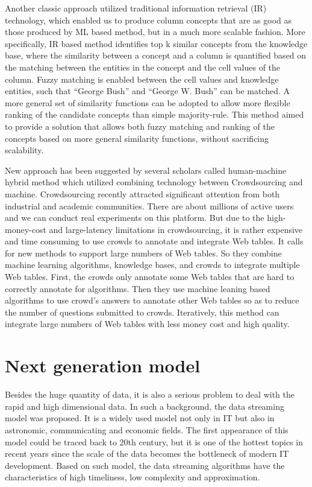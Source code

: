 \documentclass{article} %
\begin{document}
Another classic approach utilized traditional information retrieval (IR) technology, which enabled us to produce column concepts that are as good as those produced by ML based method, but in a much more scalable fashion. More specifically, IR based method identifies top k similar concepts from the knowledge base, where the similarity between a concept and a column is quantified based on the matching between the entities in the concept and the cell values of the column. Fuzzy matching is enabled between the cell values and knowledge entities, such that “George Bush” and “George W. Bush” can be matched. A more general set of similarity functions can be adopted to allow more flexible ranking of the candidate concepts than simple majority-rule. This method aimed to provide a solution that allows both fuzzy matching and ranking of the concepts based on more general similarity functions, without sacrificing scalability.

New approach has been suggested by several scholars called human-machine hybrid method which utilized combining technology between Crowdsourcing and machine. Crowdsourcing recently attracted significant attention from both industrial and academic communities. There are about millions of active users and we can conduct real experiments on this platform. But due to the high-money-cost and large-latency limitations in crowdsourcing, it is rather expensive and time consuming to use crowds to annotate and integrate Web tables. It calls for new methods to support large numbers of Web tables. So they combine machine learning algorithms, knowledge bases, and crowds to integrate multiple Web tables. First, the crowds only annotate some Web tables that are hard to correctly annotate for algorithms. Then they use machine leaning based algorithms to use crowd’s answers to annotate other Web tables so as to reduce the number of questions submitted to crowds. Iteratively, this method can integrate large numbers of Web tables with less money cost and high quality.

\section{Next generation model}
Besides the huge quantity of data, it is also a serious problem to deal with the rapid and high dimensional data. In such a background, the data streaming model was proposed. It is a widely used model not only in IT but also in astronomic, communicating and economic fields. The first appearance of this model could be traced back to 20th century, but it is one of the hottest topics in recent years since the scale of the data becomes the bottleneck of modern IT development. Based on such model, the data streaming algorithms have the characteristics of high timeliness, low complexity and approximation.
\end{document}
